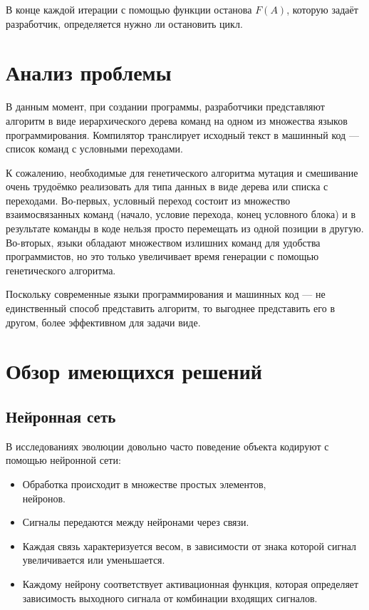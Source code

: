\documentclass[utf8,a5paper,portrait,10pt,twoside]{eskdtext}
\begin{document}
В конце каждой итерации с помощью функции останова $F(A)$, которую задаёт
разработчик, определяется нужно ли остановить цикл.

\section{Анализ проблемы}

В данным момент, при создании программы, разработчики представляют алгоритм в
виде иерархического дерева команд на одном из множества языков программирования.
Компилятор транслирует исходный текст в машинный код — список команд с условными
переходами.

К сожалению, необходимые для генетического алгоритма мутация и смешивание очень
трудоёмко реализовать для типа данных в виде дерева или списка с переходами.
Во-первых, условный переход состоит из множество взаимосвязанных команд (начало,
условие перехода, конец условного блока) и в результате команды в коде нельзя
просто перемещать из одной позиции в другую. Во-вторых, языки обладают
множеством излишних команд для удобства программистов, но это только увеличивает
время генерации с помощью генетического алгоритма.

Поскольку современные языки программирования и машинных код — не
единственный способ представить алгоритм, то выгоднее представить его в другом,
более эффективном для задачи виде.

\newpage
\section{Обзор имеющихся решений}

\subsection{Нейронная сеть}

В исследованиях эволюции\cite{communication} довольно часто поведение объекта 
кодируют с помощью нейронной сети:\cite{neural}
\begin{itemize}
  \item Обработка происходит в множестве простых элементов,\\ нейронов.
  \item Сигналы передаются между нейронами через связи.
  \item Каждая связь характеризуется весом, в зависимости от знака которой
        сигнал увеличивается или уменьшается.
  \item Каждому нейрону соответствует активационная функция, которая определяет 
        зависимость выходного сигнала от комбинации входящих сигналов.
\end{itemize}
\end{document}
